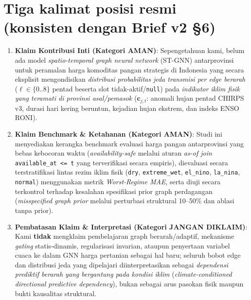 \documentclass[11pt,a4paper]{article}
\begin{document}
\section{Tiga kalimat posisi resmi (konsisten dengan Brief v2 \S6)}
\begin{enumerate}
  \item \textbf{Klaim Kontribusi Inti (Kategori AMAN)}: Sepengetahuan kami, belum ada model \emph{spatio-temporal graph neural network} (ST-GNN) antarprovinsi untuk peramalan harga komoditas pangan strategis di Indonesia yang secara eksplisit mengondisikan \emph{distribusi probabilitas jeda transmisi per edge berarah} ($\ell \in \{0..8\}$ pentad beserta slot tidak-aktif/\texttt{null}) pada \emph{indikator iklim fisik yang teramati di provinsi asal/pemasok} ($\mathbf{c}_{j,t}$: anomali hujan pentad CHIRPS v3, durasi hari kering beruntun, kejadian hujan ekstrem, dan indeks ENSO RONI).
  \item \textbf{Klaim Benchmark \& Ketahanan (Kategori AMAN)}: Studi ini menyediakan kerangka benchmark evaluasi harga pangan antarprovinsi yang bebas kebocoran waktu (\emph{availability-safe} melalui aturan \emph{as-of join} \texttt{available\_at <= t} yang terverifikasi secara empiris), dievaluasi secara terstratifikasi lintas rezim iklim fisik (\texttt{dry}, \texttt{extreme\_wet}, \texttt{el\_nino}, \texttt{la\_nina}, \texttt{normal}) menggunakan metrik \emph{Worst-Regime MAE}, serta diuji secara terkontrol terhadap kesalahan spesifikasi prior graph perdagangan (\emph{misspecified graph prior} melalui perturbasi struktural 10--50\% dan ablasi tanpa prior).
  \item \textbf{Pembatasan Klaim \& Interpretasi (Kategori JANGAN DIKLAIM)}: Kami \textbf{tidak} mengklaim pembelajaran graph berarah/adaptif, mekanisme \emph{gating} statis-dinamis, regularisasi invarian, ataupun penyertaan variabel cuaca ke dalam GNN harga pertanian sebagai hal baru; seluruh bobot edge dan distribusi jeda yang dipelajari diinterpretasikan sebagai \emph{dependensi prediktif berarah yang bergantung pada kondisi iklim} (\emph{climate-conditioned directional predictive dependency}), bukan sebagai arus pasokan fisik maupun bukti kausalitas struktural.
\end{enumerate}
\end{document}
